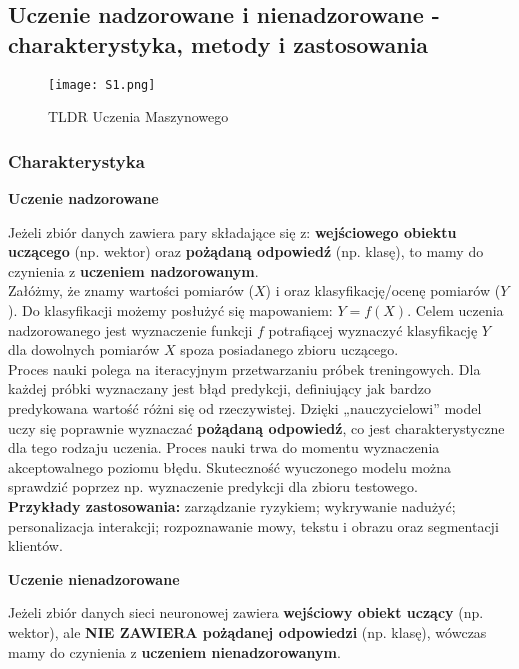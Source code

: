 \subsection{Uczenie nadzorowane i nienadzorowane - charakterystyka, metody i zastosowania}

\begin{figure}[H]
	\centering
	\texttt{[image: S1.png]}
	\caption{TLDR Uczenia Maszynowego}
\end{figure}

\subsubsection{Charakterystyka}

\centerline{\textbf{Uczenie nadzorowane}}

Jeżeli zbiór danych zawiera pary składające się z: \textbf{wejściowego obiektu uczącego} (np. wektor) oraz \textbf{pożądaną odpowiedź} (np. klasę), to mamy do czynienia z \textbf{uczeniem nadzorowanym}. \\

Załóżmy, że znamy wartości pomiarów ($X$) i oraz klasyfikację/ocenę pomiarów ($Y$). Do klasyfikacji możemy posłużyć się mapowaniem: $Y=f(X)$. Celem uczenia nadzorowanego jest wyznaczenie funkcji $f$ potrafiącej wyznaczyć klasyfikację $Y$ dla dowolnych pomiarów $X$ spoza posiadanego zbioru uczącego. \\

Proces nauki polega na iteracyjnym przetwarzaniu próbek treningowych. Dla każdej próbki wyznaczany jest błąd predykcji, definiujący jak bardzo predykowana wartość różni się od rzeczywistej. Dzięki „nauczycielowi” model uczy się poprawnie wyznaczać \textbf{pożądaną odpowiedź}, co jest charakterystyczne dla tego rodzaju uczenia. Proces nauki trwa do momentu wyznaczenia akceptowalnego poziomu błędu. Skuteczność wyuczonego modelu można sprawdzić poprzez np. wyznaczenie predykcji dla zbioru testowego. \\

\textbf{Przykłady zastosowania:} zarządzanie ryzykiem; wykrywanie nadużyć; personalizacja interakcji; rozpoznawanie mowy, tekstu i obrazu oraz segmentacji klientów. \\

\centerline{\textbf{Uczenie nienadzorowane}}

Jeżeli zbiór danych sieci neuronowej zawiera\textbf{ wejściowy obiekt uczący} (np. wektor), ale \textbf{NIE ZAWIERA pożądanej odpowiedzi} (np. klasę), wówczas mamy do czynienia z \textbf{uczeniem nienadzorowanym}. \\

